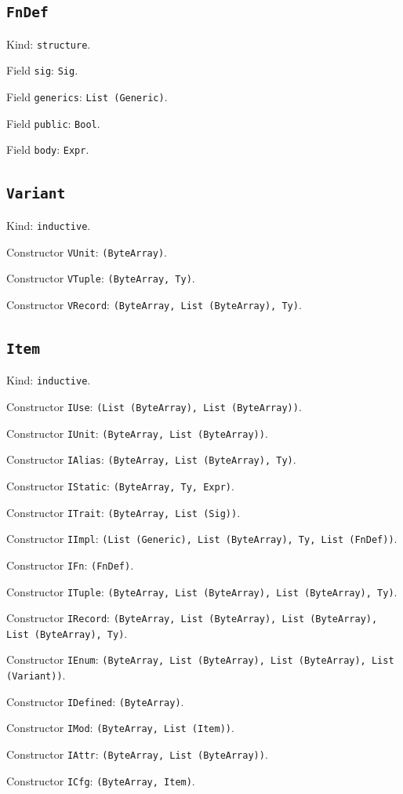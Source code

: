 \documentclass[11pt]{article}
\begin{document}
\subsection*{\texttt{FnDef}}
\noindent Kind: \texttt{structure}.\par
\noindent Field \texttt{sig}: \texttt{Sig}.\par
\noindent Field \texttt{generics}: \texttt{List (Generic)}.\par
\noindent Field \texttt{public}: \texttt{Bool}.\par
\noindent Field \texttt{body}: \texttt{Expr}.\par
\subsection*{\texttt{Variant}}
\noindent Kind: \texttt{inductive}.\par
\noindent Constructor \texttt{VUnit}: \texttt{(ByteArray)}.\par
\noindent Constructor \texttt{VTuple}: \texttt{(ByteArray, Ty)}.\par
\noindent Constructor \texttt{VRecord}: \texttt{(ByteArray, List (ByteArray), Ty)}.\par
\subsection*{\texttt{Item}}
\noindent Kind: \texttt{inductive}.\par
\noindent Constructor \texttt{IUse}: \texttt{(List (ByteArray), List (ByteArray))}.\par
\noindent Constructor \texttt{IUnit}: \texttt{(ByteArray, List (ByteArray))}.\par
\noindent Constructor \texttt{IAlias}: \texttt{(ByteArray, List (ByteArray), Ty)}.\par
\noindent Constructor \texttt{IStatic}: \texttt{(ByteArray, Ty, Expr)}.\par
\noindent Constructor \texttt{ITrait}: \texttt{(ByteArray, List (Sig))}.\par
\noindent Constructor \texttt{IImpl}: \texttt{(List (Generic), List (ByteArray), Ty, List (FnDef))}.\par
\noindent Constructor \texttt{IFn}: \texttt{(FnDef)}.\par
\noindent Constructor \texttt{ITuple}: \texttt{(ByteArray, List (ByteArray), List (ByteArray), Ty)}.\par
\noindent Constructor \texttt{IRecord}: \texttt{(ByteArray, List (ByteArray), List (ByteArray), List (ByteArray), Ty)}.\par
\noindent Constructor \texttt{IEnum}: \texttt{(ByteArray, List (ByteArray), List (ByteArray), List (Variant))}.\par
\noindent Constructor \texttt{IDefined}: \texttt{(ByteArray)}.\par
\noindent Constructor \texttt{IMod}: \texttt{(ByteArray, List (Item))}.\par
\noindent Constructor \texttt{IAttr}: \texttt{(ByteArray, List (ByteArray))}.\par
\noindent Constructor \texttt{ICfg}: \texttt{(ByteArray, Item)}.\par
\end{document}
